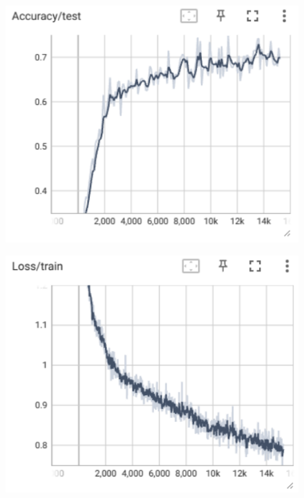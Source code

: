 \documentclass[12pt]{article}
\begin{document}
\begin{figure}[htbp]
	\centering
	\begin{minipage}{0.4\linewidth}
		\centering
		\includegraphics[width=0.9\linewidth]{./figures/4w1s_acc.png}
		\label{pic one}%
	\end{minipage}
	\begin{minipage}{0.4\linewidth}
		\centering
		\includegraphics[width=0.9\linewidth]{./figures/4w1s_train_loss.png}
		\label{pic two}%
	\end{minipage}
	\begin{minipage}{0.4\linewidth}
		\centering

\end{minipage}
\end{figure}
\end{document}
